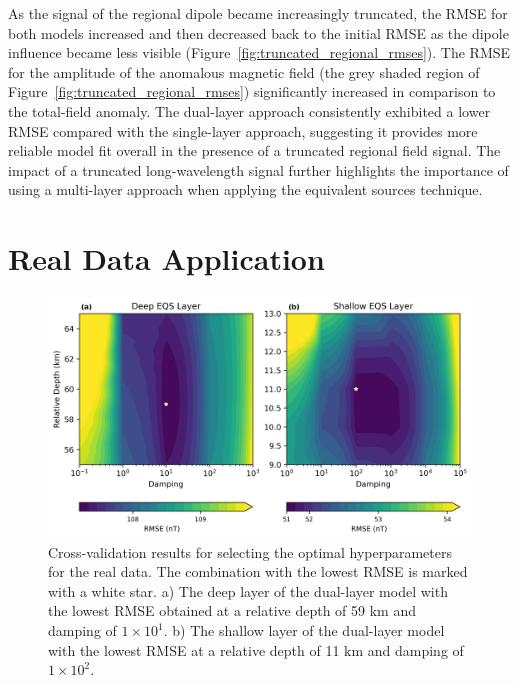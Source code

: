 As the signal of the regional dipole became increasingly truncated, the RMSE for both models increased and then decreased back to the initial RMSE as the dipole influence became less visible (Figure~\ref{fig:truncated_regional_rmses}). The RMSE for the amplitude of the anomalous magnetic field (the grey shaded region of Figure~\ref{fig:truncated_regional_rmses}) significantly increased in comparison to the total-field anomaly. The dual-layer approach consistently exhibited a lower RMSE compared with the single-layer approach, suggesting it provides more reliable model fit overall in the presence of a truncated regional field signal. The impact of a truncated long-wavelength signal further highlights the importance of using a multi-layer approach when applying the equivalent sources technique.


\section{Real Data Application}
\label{sec:real_application}

\begin{figure}[tb!]
\centering
\includegraphics[width=1\linewidth]{paper/figures/cv_real.png}
\caption{
    Cross-validation results for selecting the optimal hyperparameters for the real data. The combination with the lowest RMSE is marked with a white star. a) The deep layer of the dual-layer model with the lowest RMSE obtained at a relative depth of 59 km and damping of $1 \times 10^1$. b) The shallow layer of the dual-layer model with the lowest RMSE at a relative depth of 11 km and damping of $1 \times 10^2$.
}
\label{fig:cv_real}
\end{figure}

